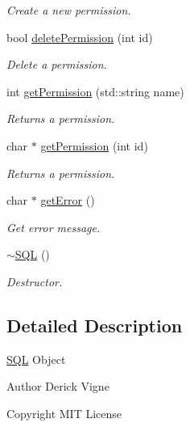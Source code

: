 \begin{DoxyCompactItemize}
\begin{DoxyCompactList}\small\item\em Create a new permission. \end{DoxyCompactList}\item 
bool \hyperlink{class_s_q_l_a9f0cbf3bec8654c33fd24e41d84f6c6a}{delete\+Permission} (int id)
\begin{DoxyCompactList}\small\item\em Delete a permission. \end{DoxyCompactList}\item 
int \hyperlink{class_s_q_l_aa1a27ec895faa8c45dabdd80c558c2d7}{get\+Permission} (std\+::string name)
\begin{DoxyCompactList}\small\item\em Returns a permission. \end{DoxyCompactList}\item 
char $\ast$ \hyperlink{class_s_q_l_a79f54d3abd1591cf0f0653023ddca75d}{get\+Permission} (int id)
\begin{DoxyCompactList}\small\item\em Returns a permission. \end{DoxyCompactList}\item 
\mbox{\label{class_s_q_l_a9d67251af02f8dbc34fd921a8bfdf747}} 
char $\ast$ \hyperlink{class_s_q_l_a9d67251af02f8dbc34fd921a8bfdf747}{get\+Error} ()
\begin{DoxyCompactList}\small\item\em Get error message. \end{DoxyCompactList}\item 
\hyperlink{class_s_q_l_a1c65a40213ae07fdd8f25bd292b2a68c}{$\sim$\+S\+QL} ()
\begin{DoxyCompactList}\small\item\em Destructor. \end{DoxyCompactList}\end{DoxyCompactItemize}


\subsection{Detailed Description}
\hyperlink{class_s_q_l}{S\+QL} Object \begin{DoxyAuthor}{Author}
Derick Vigne 
\end{DoxyAuthor}
\begin{DoxyCopyright}{Copyright}
M\+IT License 
\end{DoxyCopyright}


